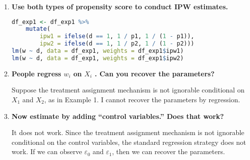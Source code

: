 \documentclass[11pt]{article}
\begin{document}
\begin{enumerate}
            \item {\bf Use both types of propensity score to conduct IPW estimates.}
            
            \begin{lstlisting}[language=R]
df_exp1 <- df_exp1 %>%
    mutate(
        ipw1 = ifelse(d == 1, 1 / p1, 1 / (1 - p1)),
        ipw2 = ifelse(d == 1, 1 / p2, 1 / (1 - p2)))
lm(w ~ d, data = df_exp1, weights = df_exp1$ipw1)
lm(w ~ d, data = df_exp1, weights = df_exp1$ipw2)
            \end{lstlisting} 
            
            \item {\bf People regress $w_i$ on $X_i$ . Can you recover the parameters?}
            
            Suppose the treatment assignment mechanism is not ignorable conditional on $X_1$ and $X_2$, as in Example 1. I cannot recover the parameters by regression.
            
            \item {\bf Now estimate by adding “control variables.” Does that work?}
            
            It does not work. Since the treatment assignment mechanism is not ignorable conditional on the control variables, the standard regression strategy does not work. If we can observe $\varepsilon_0$ and $\varepsilon_1$, then we can recover the parameters.
            
        \end{enumerate}
        
\end{document}
